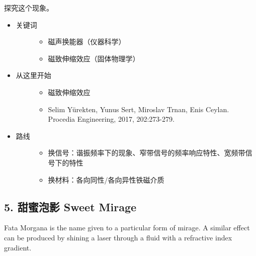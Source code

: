 \documentclass[a4paper,10pt,english]{sphinxmanual}
\begin{document}
探究这个现象。
\begin{itemize}
\item {} \begin{description}
\item[{关键词}] \leavevmode\begin{itemize}
\item {} 
磁声换能器（仪器科学）

\item {} 
磁致伸缩效应（固体物理学）

\end{itemize}

\end{description}

\item {} \begin{description}
\item[{从这里开始}] \leavevmode\begin{itemize}
\item {} 
磁致伸缩效应 

\item {} 
Selim Yürekten, Yunus Sert, Miroslav Trnan, Enis Ceylan.  Procedia Engineering, 2017, 202:273-279.

\end{itemize}

\end{description}

\item {} \begin{description}
\item[{路线}] \leavevmode\begin{itemize}
\item {} 
换信号：谐振频率下的现象、窄带信号的频率响应特性、宽频带信号下的特性

\item {} 
换材料：各向同性/各向异性铁磁介质

\end{itemize}

\end{description}

\end{itemize}


\subsection{5. 甜蜜泡影 Sweet Mirage}
\label{\detokenize{8. Appendix:sweet-mirage}}
Fata Morgana is the name given to a particular form of mirage. A similar effect can be produced by shining a laser through a fluid with a refractive index gradient.
\end{document}
